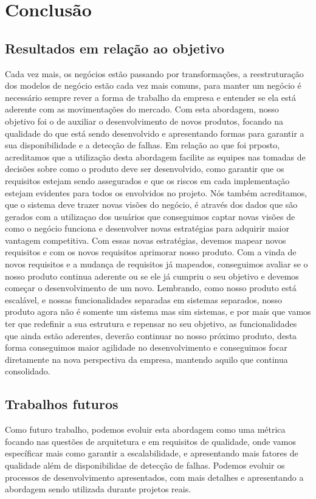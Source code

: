 \chapter{Conclusão}
  \section{Resultados em relação ao objetivo}
  Cada vez mais, os negócios estão passando por transformações, a reestruturação
  dos modelos de negócio estão cada vez mais comuns, para manter um negócio é
  necessário sempre rever a forma de trabalho da empresa e entender se ela está
  aderente com as movimentações do mercado. \newline
  Com esta abordagem, nosso objetivo foi o de auxiliar o desenvolvimento de novos
  produtos, focando na qualidade do que está sendo desenvolvido e apresentando
  formas para garantir a sua disponibilidade e a detecção de falhas. Em relação
  ao que foi prposto, acreditamos que a utilização desta abordagem facilite as
  equipes nas tomadas de decisões sobre como o produto deve ser desenvolvido,
  como garantir que os requisitos estejam sendo assegurados e que os riscos em
  cada implementação estejam evidentes para todos os envolvidos no projeto.\newline
  Nós também acreditamos, que o sistema deve trazer novas visões do negócio, é
  através dos dados que são gerados com a utilizaçao dos usuários que conseguimos
  captar novas visões de como o negócio funciona e desenvolver novas estratégias
  para adquirir maior vantagem competitiva. Com essas novas estratégias, devemos
  mapear novos requisitos e com os novos requisitos aprimorar nosso produto. \newline
  Com a vinda de novos requisitos e a mudança de requisitos já mapeados, conseguimos
  avaliar se o nosso produto continua aderente ou se ele já cumpriu o seu objetivo
  e devemos começar o desenvolvimento de um novo. Lembrando, como nosso produto
  está escalável, e nossas funcionalidades separadas em sistemas separados, nosso
  produto agora não é somente um sistema mas sim sistemas, e por mais que vamos
  ter que redefinir a sua estrutura e repensar no seu objetivo, as funcionalidades
  que ainda estão aderentes, deverão continuar no nosso próximo produto, desta
  forma conseguimos maior agilidade no desenvolvimento e conseguimos focar
  diretamente na nova perspectiva da empresa, mantendo aquilo que continua
  consolidado.

  \section{Trabalhos futuros}
  Como futuro trabalho, podemos evoluir esta abordagem como uma métrica focando
  nas questões de arquitetura e em requisitos de qualidade, onde vamos específicar
  mais como garantir a escalabilidade, e apresentando mais fatores de qualidade
  além de disponibilidae de detecção de falhas. Podemos evoluir os processos de
  desenvolvimento apresentados, com mais detalhes e apresentando a abordagem sendo
  utilizada durante projetos reais.
